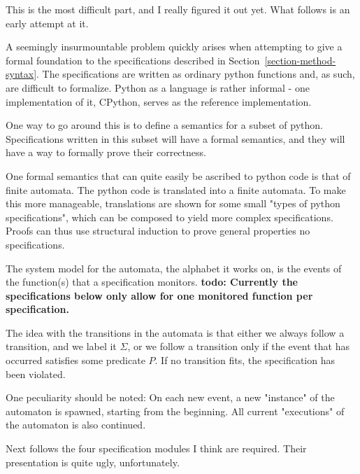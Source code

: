 \documentclass[a4paper,11pt]{kth-mag}
\newcommand{\todo}[1]{\textbf{todo: #1}}
\begin{document}
This is the most difficult part, and I really figured it out yet. What follows
is an early attempt at it.

A seemingly insurmountable problem quickly arises when attempting to give a
formal foundation to the specifications described in
Section~\ref{section-method-syntax}. The specifications are written as ordinary
python functions and, as such, are difficult to formalize. Python as a language
is rather informal - one implementation of it, CPython, serves as the reference
implementation.

One way to go around this is to define a semantics for a subset of python.
Specifications written in this subset will have a formal semantics, and they
will have a way to formally prove their correctness.

One formal semantics that can quite easily be ascribed to python code is that
of finite automata. The python code is translated into a finite automata. To
make this more manageable, translations are shown for some small "types of
python specifications", which can be composed to yield more complex
specifications. Proofs can thus use structural induction to prove general
properties no specifications.

The system model for the automata, the alphabet it works on, is the events of
the function(s) that a specification monitors. \todo{Currently the
specifications below only allow for one monitored function per specification.}

The idea with the transitions in the automata is that either we always follow a
transition, and we label it $\Sigma$, or we follow a transition only if the
event that has occurred satisfies some predicate $P$. If no transition fits,
the specification has been violated.

One peculiarity should be noted: On each new event, a new "instance" of the
automaton is spawned, starting from the beginning. All current "executions" of
the automaton is also continued.

Next follows the four specification modules I think are required. Their
presentation is quite ugly, unfortunately.
\end{document}
